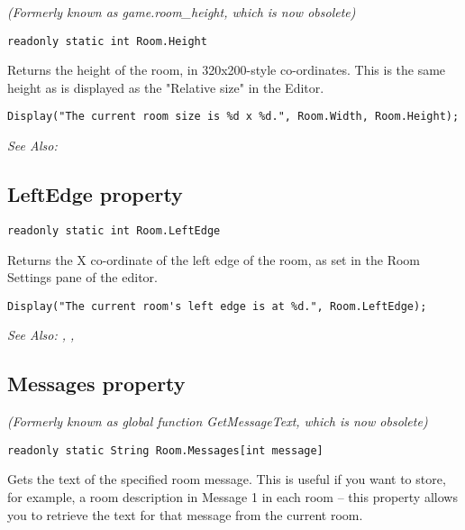 \it{(Formerly known as game.room_height, which is now obsolete)}

\begin{verbatim}
readonly static int Room.Height
\end{verbatim}
Returns the height of the room, in 320x200-style co-ordinates. This is
the same height as is displayed as the "Relative size" in the Editor.

\begin{verbatim}
Display("The current room size is %d x %d.", Room.Width, Room.Height);
\end{verbatim}

\it{See Also:} 


\subsection{LeftEdge property}\label{Room.LeftEdge}%

\begin{verbatim}
readonly static int Room.LeftEdge
\end{verbatim}
Returns the X co-ordinate of the left edge of the room, as set in the Room Settings
pane of the editor.

\begin{verbatim}
Display("The current room's left edge is at %d.", Room.LeftEdge);
\end{verbatim}

\it{See Also:} , ,


\subsection{Messages property}\label{Room.Messages}%

\it{(Formerly known as global function GetMessageText, which is now obsolete)}

\begin{verbatim}
readonly static String Room.Messages[int message]
\end{verbatim}
Gets the text of the specified room message. This is useful if you want to store,
for example, a room description in Message 1 in each room -- this property allows
you to retrieve the text for that message from the current room.

